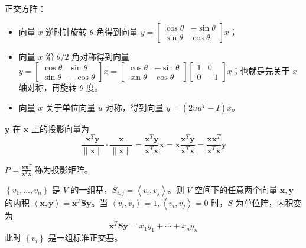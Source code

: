 \begin{remark}
    正交方阵：
    \begin{itemize}
        \item 向量 $x$ 逆时针旋转 $\theta$ 角得到向量 $y = \begin{bmatrix}
            \cos\theta & -\sin\theta \\ 
            \sin\theta & \cos\theta
        \end{bmatrix}x$；
        \item 向量 $x$ 沿 $\theta/2$ 角对称得到向量 $y = \begin{bmatrix}
            \cos\theta & \sin\theta \\ 
            \sin\theta & -\cos\theta
        \end{bmatrix}x = \begin{bmatrix}
            \cos\theta & -\sin\theta \\ 
            \sin\theta & \cos\theta
        \end{bmatrix}\begin{bmatrix}
            1 & 0 \\
            0 & -1
        \end{bmatrix}x$；也就是先关于 $x$ 轴对称，再旋转 $\theta$ 度。
        \item 向量 $x$ 关于单位向量 $u$ 对称，得到向量 $y = (2uu^T-I)x$。
    \end{itemize}
\end{remark}

\begin{remark}
    $\boldsymbol{y}$ 在 $\boldsymbol{x}$ 上的投影向量为 \[\frac{\boldsymbol{x}^{T} \boldsymbol{y}}{\|\boldsymbol{x}\|} \cdot \frac{\boldsymbol{x}}{\|\boldsymbol{x}\|}=\frac{\boldsymbol{x}^{T} \boldsymbol{y}}{\boldsymbol{x}^{T} \boldsymbol{x}} \boldsymbol{x}=\boldsymbol{x} \frac{\boldsymbol{x}^{T} \boldsymbol{y}}{\boldsymbol{x}^{T} \boldsymbol{x}}=\frac{\boldsymbol{x} \boldsymbol{x}^{T}}{\boldsymbol{x}^{T} \boldsymbol{x}} \boldsymbol{y}\]
    
    $P = \frac{\boldsymbol{x} \boldsymbol{x}^{T}}{\boldsymbol{x}^{T} \boldsymbol{x}}$ 称为投影矩阵。
\end{remark}

\begin{remark}
    $\left\{v_1, \dots, v_n\right\}$ 是 $V$ 的一组基，$S_{i, j} = \left\langle v_{i}, v_{j}\right\rangle$。则 $V$ 空间下的任意两个向量 $\boldsymbol{x}, \boldsymbol{y}$ 的内积 $\left\langle\boldsymbol{x}, \boldsymbol{y}\right\rangle=\boldsymbol{x}^T\boldsymbol{S}\boldsymbol{y}$。当 $\left\langle v_{i}, v_{i}\right\rangle = 1, \left\langle v_{i}, v_{j}\right\rangle = 0$ 时，$S$ 为单位阵，内积变为 \[\boldsymbol{x}^T\boldsymbol{S}\boldsymbol{y} = x_1y_1 + \cdots + x_ny_n\]
    此时 $\left\{v_i\right\}$ 是一组标准正交基。
\end{remark}

